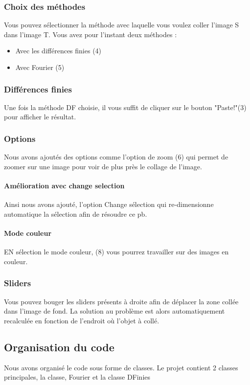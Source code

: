 \subsubsection{Choix des méthodes}
Vous pouvez sélectionner la méthode avec laquelle vous voulez coller l'image S dans l'image T. Vous avez pour l'instant deux méthodes : 
\begin{itemize}
    \item Avec les différences finies (4)
    \item Avec Fourier (5)
\end{itemize}{}

\subsubsection{Différences finies}
Une fois la méthode DF choisie, il vous suffit de cliquer sur le bouton "Paste!"(3)  pour afficher le résultat.
\subsubsection{Options}
Nous avons ajoutés des options comme l'option de zoom (6) qui permet de zoomer sur une image pour voir de plus près le collage de l'image. 
\paragraph{ Amélioration avec change selection}
Ainsi nous avons ajouté, l'option Change sélection qui re-dimensionne automatique la sélection afin de résoudre ce pb. 
\paragraph{Mode couleur}
EN sélection le mode couleur, (8) vous pourrez travailler sur des images en couleur. 

\subsubsection{Sliders}
Vous pouvez bouger les sliders présents à droite afin de déplacer la zone collée dans l'image de fond. La solution au problème est alors automatiquement recalculée en fonction de l'endroit où l'objet à collé. 

\subsection{Organisation du code}
Nous avons organisé le code sous forme de classes. Le projet contient 2 classes principales, la classe, Fourier et la classe DFinies

